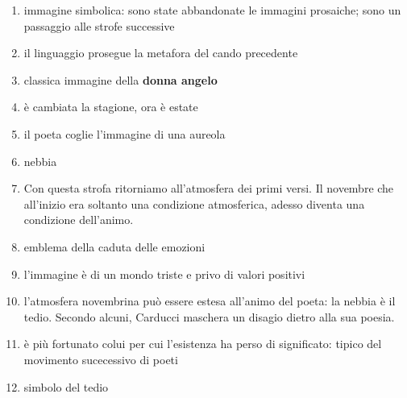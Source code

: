 \documentclass{book}
\begin{document}
\begin{enumerate}
\item immagine simbolica: sono state abbandonate le immagini prosaiche; sono un passaggio alle strofe successive
\item il linguaggio prosegue la metafora del cando precedente
\item classica immagine della \textbf{donna angelo}
\item è cambiata la stagione, ora è estate
\item il poeta coglie l'immagine di una aureola
\item nebbia
\item Con questa strofa ritorniamo all’atmosfera dei primi versi. Il novembre che all’inizio era soltanto una condizione atmosferica, adesso diventa una condizione dell’animo.
\item emblema della caduta delle emozioni
\item l'immagine è di un mondo triste e privo di valori positivi
\item l'atmosfera novembrina può essere estesa all'animo del poeta: la nebbia è il tedio. Secondo alcuni, Carducci maschera un disagio dietro alla sua poesia.
\item è più fortunato colui per cui l'esistenza ha perso di significato: tipico del movimento sucecessivo di poeti
\item simbolo del tedio
\end{enumerate}
\end{document}
